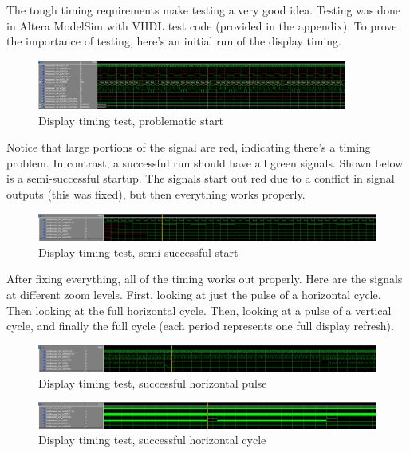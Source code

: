 The tough timing requirements make testing a very good idea. Testing was done in Altera ModelSim with VHDL test code (provided in the appendix). To prove the importance of testing, here's an initial run of the display timing.

\begin{figure}[ht!]
    \centering
    \includegraphics[width=4in]{timing/VRAM-test/vram-problem-start.png}
		\caption{Display timing test, problematic start}
\end{figure}

Notice that large portions of the signal are red, indicating there's a timing problem. In contrast, a successful run should have all green signals. Shown below is a semi-successful startup. The signals start out red due to a conflict in signal outputs (this was fixed), but then everything works properly.

\begin{figure}[ht!]
    \centering
    \includegraphics[width=6in]{timing/VRAM-test/display-success-start.png}
		\caption{Display timing test, semi-successful start}
\end{figure}

After fixing everything, all of the timing works out properly. Here are the signals at different zoom levels. First, looking at just the pulse of a horizontal cycle. Then looking at the full horizontal cycle. Then, looking at a pulse of a vertical cycle, and finally the full cycle (each period represents one full display refresh).

\begin{figure}[ht!]
    \centering
    \includegraphics[width=6in]{timing/VRAM-test/display-success-horiz-pulse.png}
		\caption{Display timing test, successful horizontal pulse}
\end{figure}

\begin{figure}[ht!]
    \centering
    \includegraphics[width=6in]{timing/VRAM-test/display-success-full-horiz.png}
		\caption{Display timing test, successful horizontal cycle}
\end{figure}


